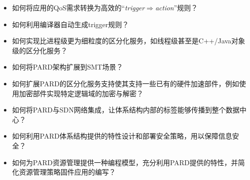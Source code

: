 \begin{itemize}[nolistsep]
  \item 如何将应用的QoS需求转换为高效的``\emph{trigger$\Rightarrow$action}''规则？
  \item 如何利用编译器自动生成trigger规则？
  \item 如何实现比进程级更为细粒度的区分化服务，如线程级甚至是C++/Java对象级的区分化服务？
  \item 如何将PARD架构扩展到SMT场景？
  \item 如何扩展PARD的区分化服务支持使其支持一些已有的硬件加速部件，例如使用加密部件实现特定逻辑域的加密与解密？
  \item 如何将PARD与SDN网络集成，让体系结构内部的标签能够传播到整个数据中心？
  \item 如何利用PARD体系结构提供的特性设计和部署安全策略，用以保障信息安全？
  \item 如何为PARD资源管理提供一种编程模型，充分利用PARD提供的特性，并简化资源管理策略固件应用的编写？
\end{itemize}


